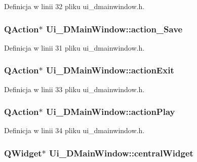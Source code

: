 Definicja w linii 32 pliku ui\-\_\-dmainwindow.\-h.

\hypertarget{class_ui___d_main_window_a7ab98279e07bdd724a091ea06012c87b}{
\subsubsection[{action\-\_\-\-Save}]{\setlength{\rightskip}{0pt plus 5cm}Q\-Action$\ast$ Ui\-\_\-\-D\-Main\-Window\-::action\-\_\-\-Save}}\label{class_ui___d_main_window_a7ab98279e07bdd724a091ea06012c87b}


Definicja w linii 31 pliku ui\-\_\-dmainwindow.\-h.

\hypertarget{class_ui___d_main_window_ae1fa62a4d27fa0f4a5c63c7c60cfdad2}{
\subsubsection[{action\-Exit}]{\setlength{\rightskip}{0pt plus 5cm}Q\-Action$\ast$ Ui\-\_\-\-D\-Main\-Window\-::action\-Exit}}\label{class_ui___d_main_window_ae1fa62a4d27fa0f4a5c63c7c60cfdad2}


Definicja w linii 33 pliku ui\-\_\-dmainwindow.\-h.

\hypertarget{class_ui___d_main_window_a6cfb6311ca1dd6e247d80255e2667ba7}{
\subsubsection[{action\-Play}]{\setlength{\rightskip}{0pt plus 5cm}Q\-Action$\ast$ Ui\-\_\-\-D\-Main\-Window\-::action\-Play}}\label{class_ui___d_main_window_a6cfb6311ca1dd6e247d80255e2667ba7}


Definicja w linii 34 pliku ui\-\_\-dmainwindow.\-h.

\hypertarget{class_ui___d_main_window_a94cf40cb4e645cfa2e80f36ffbf5018e}{
\subsubsection[{central\-Widget}]{\setlength{\rightskip}{0pt plus 5cm}Q\-Widget$\ast$ Ui\-\_\-\-D\-Main\-Window\-::central\-Widget}}\label{class_ui___d_main_window_a94cf40cb4e645cfa2e80f36ffbf5018e}


